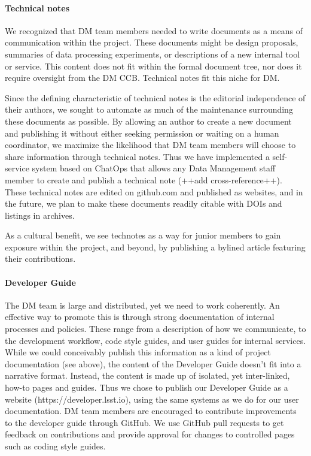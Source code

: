 \paragraph{Technical notes}

We recognized that DM team members needed to write documents as a means of communication within the project.
These documents might be design proposals, summaries of data processing experiments, or descriptions of a new internal tool or service.
This content does not fit within the formal document tree, nor does it require oversight from the DM CCB.
Technical notes fit this niche for DM.

Since the defining characteristic of technical notes is the editorial independence of their authors, we sought to automate as much of the maintenance surrounding these documents as possible.
By allowing an author to create a new document and publishing it without either seeking permission or waiting on a human coordinator, we maximize the likelihood that DM team members will choose to share information through technical notes.
Thus we have implemented a self-service system based on ChatOps that allows any Data Management staff member to create and publish a technical note (++add cross-reference++).
These technical notes are edited on github.com and published as websites, and in the future, we plan to make these documents readily citable with DOIs and listings in archives.

As a cultural benefit, we see technotes as a way for junior members to gain exposure within the project, and beyond, by publishing a bylined article featuring their contributions.

\paragraph{Developer Guide}

The DM team is large and distributed, yet we need to work coherently.
An effective way to promote this is through strong documentation of internal processes and policies.
These range from a description of how we communicate, to the development workflow, code style guides, and user guides for internal services.
While we could conceivably publish this information as a kind of project documentation (see above), the content of the Developer Guide doesn't fit into a narrative format.
Instead, the content is made up of isolated, yet inter-linked, how-to pages and guides.
Thus we chose to publish our Developer Guide as a website (https://developer.lsst.io), using the same systems as we do for our user documentation.
DM team members are encouraged to contribute improvements to the developer guide through GitHub.
We use GitHub pull requests to get feedback on contributions and provide approval for changes to controlled pages such as coding style guides.

